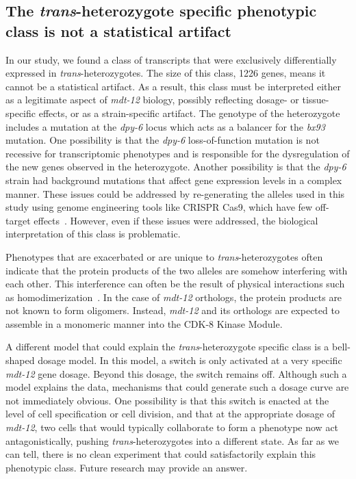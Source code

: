 \documentclass[10pt, twocolumn]{article}
\newcommand{\gene}[1]{\mbox{\emph{#1}}}
\newcommand{\protein}[1]{\mbox{\uppercase{#1}}}
\newcommand{\dpy}{\gene{mdt-12}}
\begin{document}
\subsection*{The \emph{trans}-heterozygote specific phenotypic class is not a
             statistical artifact}
In our study, we found a class of transcripts that were exclusively
differentially expressed in \emph{trans}-heterozygotes. The size of this class,
1226 genes, means it cannot be a statistical artifact. As a result, this class
must be interpreted either as a legitimate aspect of \dpy{} biology, possibly
reflecting dosage- or tissue-specific effects, or as a strain-specific artifact.
The genotype of the heterozygote includes a mutation at the \gene{dpy-6} locus
which acts as a balancer for the \emph{bx93} mutation. One possibility is that
the \emph{dpy-6} loss-of-function mutation is not recessive for transcriptomic
phenotypes and is responsible for the dysregulation of the new genes observed in
the heterozygote. Another possibility is that the \emph{dpy-6} strain had
background mutations that affect gene expression levels in a complex manner.
These issues could be addressed by re-generating the alleles used in this study
using genome engineering tools like CRISPR Cas9, which have few off-target
effects~\cite{}. However, even if these issues were addressed, the biological
interpretation of this class is problematic.

Phenotypes that are exacerbated or are unique to \emph{trans}-heterozygotes often
indicate that the protein products of the two alleles are somehow interfering
with each other. This interference can often be the result of physical interactions
such as homodimerization~\cite{}. In the case of \dpy{} orthologs, the protein
products are not known to form oligomers. Instead, \dpy{} and its orthologs are
expected to assemble in a monomeric manner into the \protein{cdk-8} Kinase Module.

A different model that could explain the \emph{trans}-heterozygote specific class
is a bell-shaped dosage model. In this model, a switch is only activated at
a very specific \dpy{} gene dosage. Beyond this dosage, the switch remains off.
Although such a model explains the data, mechanisms that could generate such
a dosage curve are not immediately obvious. One possibility is that this
switch is enacted at the level of cell specification or cell division, and that
at the appropriate dosage of \dpy{}, two cells that would typically collaborate
to form a phenotype now act antagonistically, pushing \emph{trans}-heterozygotes
into a different state. As far as we can tell, there is no clean experiment that
could satisfactorily explain this phenotypic class. Future research may provide
an answer.
\end{document}
